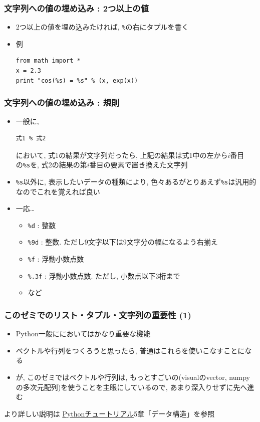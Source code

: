 \documentclass[10pt,dvipdfmx]{beamer}
\begin{document}
\begin{frame}[fragile]
\frametitle{文字列への値の埋め込み : 2つ以上の値}
\begin{itemize}
\item 2つ以上の値を埋め込みたければ, {\tt \%}の右にタプルを書く
\item 例
\begin{lstlisting}
from math import *
x = 2.3
print "cos(%s) = %s" % (x, exp(x))
\end{lstlisting}
\end{itemize}
\end{frame}

\begin{frame}[fragile]
\frametitle{文字列への値の埋め込み : 規則}

\begin{itemize}
\item 一般に,
\begin{lstlisting}
式1 % 式2
\end{lstlisting}
において, 式1の結果が文字列だったら, 
上記の結果は式1中の左から$i$番目の{\tt \%s}を, 
式2の結果の第$i$番目の要素で置き換えた文字列

\item {\tt \%s}以外に, 表示したいデータの種類により,
色々あるがとりあえず{\tt \%s}は汎用的なのでこれを覚えれば良い
\item 一応\ldots
  \begin{itemize}
  \item {\tt \%d} : 整数
  \item {\tt \%9d} : 整数. ただし9文字以下は9文字分の幅になるよう右揃え
  \item {\tt \%f} : 浮動小数点数
  \item {\tt \%.3f} : 浮動小数点数. ただし, 小数点以下3桁まで
  \item など
  \end{itemize}
\end{itemize}
\end{frame}


\begin{frame}[fragile]
\frametitle{このゼミでのリスト・タプル・文字列の重要性 (1)}
\begin{itemize}
\item Python一般ににおいてはかなり重要な機能
\item ベクトルや行列をつくろうと思ったら,
  普通はこれらを使いこなすことになる
\item が, このゼミではベクトルや行列は, 
  もっとすごいの(visualのvector, 
  numpyの多次元配列)を使うことを主眼にしているので,
  あまり深入りせずに先へ進む
\end{itemize}

より詳しい説明は
\hyperlink{http://docs.python.jp/2/tutorial/index.html}
{Pythonチュートリアル}5章「データ構造」を参照
\end{frame}
\end{document}
